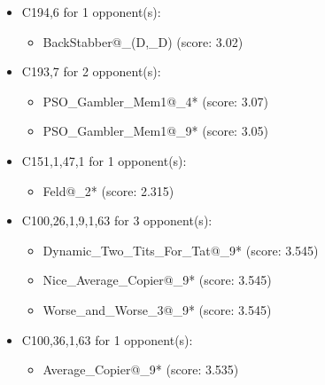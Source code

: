 \begin{appendices}
\begin{itemize}
    \item C194,6 for 1 opponent(s):
    \begin{multicols}{3}
         \begin{itemize}
            \item BackStabber@\_(D,\_D) (score: 3.02)
        \end{itemize}
     \end{multicols}
     
    \item C193,7 for 2 opponent(s):
    \begin{multicols}{3}
         \begin{itemize}
            \item PSO\_Gambler\_Mem1@\_4* (score: 3.07)
            \item PSO\_Gambler\_Mem1@\_9* (score: 3.05)
        \end{itemize}
     \end{multicols}
     
    \item C151,1,47,1 for 1 opponent(s):
    \begin{multicols}{3}
         \begin{itemize}
            \item Feld@\_2* (score: 2.315)
        \end{itemize}
     \end{multicols}
     
    \item C100,26,1,9,1,63 for 3 opponent(s):
    \begin{multicols}{3}
         \begin{itemize}
            \item Dynamic\_Two\_Tits\_For\_Tat@\_9* (score: 3.545)
            \item Nice\_Average\_Copier@\_9* (score: 3.545)
            \item Worse\_and\_Worse\_3@\_9* (score: 3.545)
        \end{itemize}
     \end{multicols}
     
    \item C100,36,1,63 for 1 opponent(s):
    \begin{multicols}{3}
         \begin{itemize}
            \item Average\_Copier@\_9* (score: 3.535)
        \end{itemize}
     \end{multicols}
     

\end{itemize}
\end{appendices}
